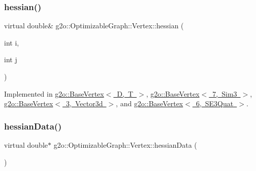 \mbox{\label{classg2o_1_1_optimizable_graph_1_1_vertex_ade95d46370bb9a86f64c4e591726ad62}} 
\subsubsection{\texorpdfstring{hessian()}{hessian()}\hspace{0.1cm}{\footnotesize\ttfamily [2/2]}}
{\footnotesize\ttfamily virtual double\& g2o\+::\+Optimizable\+Graph\+::\+Vertex\+::hessian (\begin{DoxyParamCaption}\item[{int}]{i,  }\item[{int}]{j }\end{DoxyParamCaption})\hspace{0.3cm}{\ttfamily [pure virtual]}}



Implemented in \mbox{\hyperlink{classg2o_1_1_base_vertex_a6ab2212fdb00dec460299fdbabe09cb9}{g2o\+::\+Base\+Vertex$<$ D, T $>$}}, \mbox{\hyperlink{classg2o_1_1_base_vertex_a6ab2212fdb00dec460299fdbabe09cb9}{g2o\+::\+Base\+Vertex$<$ 7, Sim3 $>$}}, \mbox{\hyperlink{classg2o_1_1_base_vertex_a6ab2212fdb00dec460299fdbabe09cb9}{g2o\+::\+Base\+Vertex$<$ 3, Vector3d $>$}}, and \mbox{\hyperlink{classg2o_1_1_base_vertex_a6ab2212fdb00dec460299fdbabe09cb9}{g2o\+::\+Base\+Vertex$<$ 6, S\+E3\+Quat $>$}}.

\mbox{\label{classg2o_1_1_optimizable_graph_1_1_vertex_a4ec536d8c82d839e507d89c7a7e368ae}} 
\subsubsection{\texorpdfstring{hessian\+Data()}{hessianData()}}
{\footnotesize\ttfamily virtual double$\ast$ g2o\+::\+Optimizable\+Graph\+::\+Vertex\+::hessian\+Data (\begin{DoxyParamCaption}{ }\end{DoxyParamCaption})\hspace{0.3cm}{\ttfamily [pure virtual]}}



